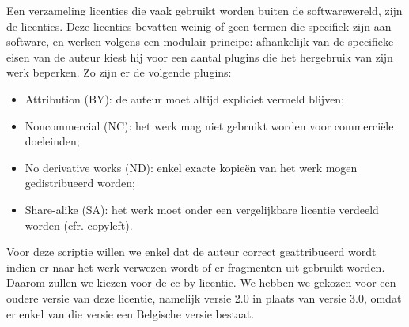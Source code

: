 Een verzameling licenties die vaak gebruikt worden buiten de softwarewereld, zijn de  licenties. Deze licenties bevatten weinig of geen termen die specifiek zijn aan software, en werken volgens een modulair principe: afhankelijk van de specifieke eisen van de auteur kiest hij voor een aantal plugins die het hergebruik van zijn werk beperken. Zo zijn er de volgende plugins:
\begin{itemize}
  \item Attribution (BY): de auteur moet altijd expliciet vermeld blijven;
  \item Noncommercial (NC): het werk mag niet gebruikt worden voor commerciële doeleinden;
  \item No derivative works (ND): enkel exacte kopieën van het werk mogen gedistribueerd worden;
  \item Share-alike (SA): het werk moet onder een vergelijkbare licentie verdeeld worden (cfr. copyleft).
\end{itemize}

Voor deze scriptie willen we enkel dat de auteur correct geattribueerd wordt indien er naar het werk verwezen wordt of er fragmenten uit gebruikt worden. Daarom zullen we kiezen voor de \ac{cc-by} licentie. We hebben we gekozen voor een oudere versie van deze licentie, namelijk versie 2.0 in plaats van versie 3.0, omdat er enkel van die versie een Belgische versie bestaat.
